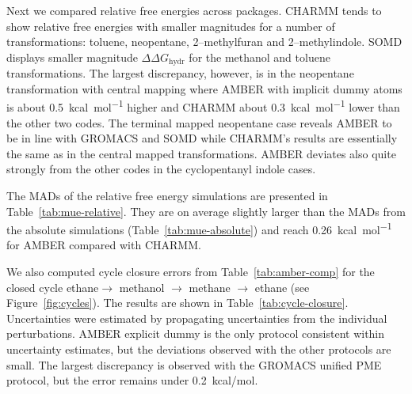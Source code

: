 \documentclass[journal=jctcce,manuscript=article]{achemso}
\begin{document}
Next we compared relative free energies across packages.
CHARMM tends to show relative free energies with smaller magnitudes for a number of transformations: toluene, neopentane, 2--methylfuran and 2--methylindole. SOMD displays smaller magnitude $\Delta\Delta G_{\mathrm{hydr}}$ for the methanol and toluene transformations.  The largest discrepancy, however, is in the neopentane transformation with central mapping where AMBER with implicit dummy atoms is about \SI{0.5}{kcal.mol^{-1}} higher and CHARMM about \SI{0.3}{kcal.mol^{-1}} lower than the other two codes.  The
terminal mapped neopentane case reveals AMBER to be in line with GROMACS and SOMD while CHARMM's results are essentially the same as in the central mapped transformations.  AMBER deviates also quite strongly from the other codes in the cyclopentanyl indole cases.

The MADs of the relative free energy simulations are presented in
Table~\ref{tab:mue-relative}.  They are on average slightly larger than the MADs from the absolute simulations (Table~\ref{tab:mue-absolute}) and reach \SI{0.26}{kcal.mol^{-1}} for AMBER compared with CHARMM.

\begin{table}[]
 \begin{minipage}{\linewidth}
   \caption{MAD (in \si{kcal.mol^{-1}}) comparing relative free energies from
     relative simulations between SOMD, GROMACS, AMBER and
     CHARMM.}\label{tab:mue-relative}
 \end{minipage}
\end{table}

We also computed cycle closure errors from Table~\ref{tab:amber-comp} for
the closed cycle ethane$ \rightarrow$ methanol $\rightarrow$ methane $\rightarrow$ ethane (see Figure~\ref{fig:cycles}). The results are shown in Table~\ref{tab:cycle-closure}. Uncertainties were estimated by propagating uncertainties from the individual perturbations. AMBER explicit dummy is the only protocol consistent within uncertainty estimates, but the deviations observed with the other protocols are small. The largest discrepancy is observed with the GROMACS unified PME protocol, but the error remains under \SI{0.2}{kcal/mol}.
\end{document}
